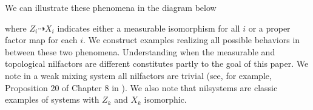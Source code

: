 \documentclass[12pt]{amsart}
\theoremstyle{definition}
\theoremstyle{plain}
\theoremstyle{definition}
\numberwithin{equation}{section}
\begin{document}
We can illustrate these phenomena in the diagram below
  \begin{center}
\end{center}
 where \( Z_i \dasharrow X_i \) indicates either a measurable isomorphism for all $i$ or a proper factor map for each $i$. We construct examples realizing all possible behaviors in between these two phenomena. Understanding when the measurable and topological nilfactors are different constitutes partly to the goal of this paper. We note in a weak mixing system all nilfactors are trivial (see, for example, Proposition 20 of Chapter 8 in \cite{HK2}). We also note that nilsystems are classic examples of systems with $Z_k$ and $X_k$ isomorphic. 
\end{document}
